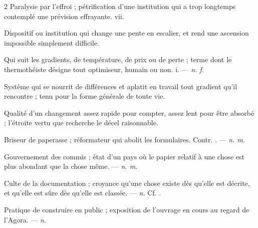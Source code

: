 \begin{multicols}{2}
 Paralysie par l'effroi ; pétrification d'une institution qui a trop longtemps contemplé une prévision effrayante.   vii.

 Dispositif ou institution qui change une pente en escalier, et rend une ascension impossible simplement difficile. 

 Qui suit les gradients, de température, de prix ou de perte ; terme dont le thermothéiste désigne tout optimiseur, humain ou non.   i. —  \textit{n. f.}

 Système qui se nourrit de différences et aplatit en travail tout gradient qu'il rencontre ; tenu pour la forme générale de toute vie.

 Qualité d'un changement assez rapide pour compter, assez lent pour être absorbé ; l'étroite vertu que recherche le décel raisonnable.

 Briseur de paperasse ; réformateur qui abolit les formulaires. Contr. . —  \textit{n. m.}

 Gouvernement des commis ; état d'un pays où le papier relatif à une chose est plus abondant que la chose même. —  \textit{n. m.}

 Culte de la documentation ; croyance qu'une chose existe dès qu'elle est décrite, et qu'elle est sûre dès qu'elle est classée. —  \textit{n.} Cf. .

 Pratique de construire en public ; exposition de l'ouvrage en cours au regard de l'Agora.  —  \textit{n.}

\end{multicols}

